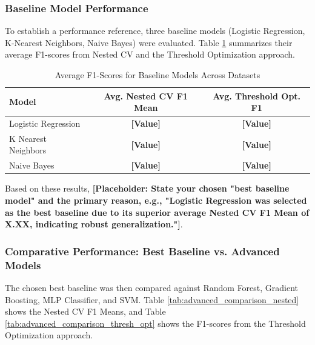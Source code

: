 \documentclass{article}
\begin{document}
\subsubsection{Baseline Model Performance}
To establish a performance reference, three baseline models (Logistic Regression, K-Nearest Neighbors, Naive Bayes) were evaluated. Table \ref{tab:baseline_perf} summarizes their average F1-scores from Nested CV and the Threshold Optimization approach.

\begin{table}[htbp]
\centering
\caption{Average F1-Scores for Baseline Models Across Datasets}
\label{tab:baseline_perf}
\begin{tabular}{lcc}
\toprule
Model                 & Avg. Nested CV F1 Mean & Avg. Threshold Opt. F1 \\
\midrule
Logistic Regression   & \textbf{[Value]} & \textbf{[Value]}    \\
K Nearest Neighbors   & \textbf{[Value]} & \textbf{[Value]}    \\
Naive Bayes           & \textbf{[Value]} & \textbf{[Value]}    \\
\bottomrule
\end{tabular}
\end{table}

Based on these results, \textbf{[Placeholder: State your chosen "best baseline model" and the primary reason, e.g., "Logistic Regression was selected as the best baseline due to its superior average Nested CV F1 Mean of X.XX, indicating robust generalization."]}.

\subsubsection{Comparative Performance: Best Baseline vs. Advanced Models}
The chosen best baseline was then compared against Random Forest, Gradient Boosting, MLP Classifier, and SVM. Table \ref{tab:advanced_comparison_nested} shows the Nested CV F1 Means, and Table \ref{tab:advanced_comparison_thresh_opt} shows the F1-scores from the Threshold Optimization approach.
\end{document}
